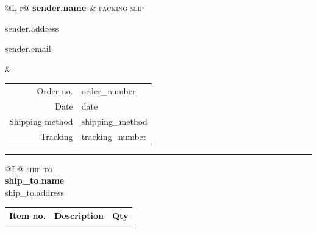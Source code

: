 \documentclass[10pt,a4paper]{article}
\newcommand{\fieldname}[1]{\textcolor{muted}{\footnotesize\scshape\MakeLowercase{#1}}}
\begin{document}
\color{ink}
{%
\begin{tabularx}{\linewidth}{@{}L r@{}}
  {\Large\bfseries\mbox{}{{ sender.name }}} & \textcolor{accent}{\fontsize{22}{24}\selectfont\scshape packing slip} \\[6pt]
  \parbox[t]{0.5\linewidth}{\raggedright\small\mbox{}{{ sender.address }}\par\mbox{}{{ sender.email }}} &
  {\small\begin{tabular}[t]{@{}r@{\hspace{8pt}}l@{}}
    \textcolor{muted}{Order no.} & {{ order_number }} \\
    \textcolor{muted}{Date} & {{ date }} \\
    \textcolor{muted}{Shipping method} & {{ shipping_method }} \\
    \textcolor{muted}{Tracking} & {{ tracking_number }} \\
  \end{tabular}}
\end{tabularx}

\vspace{10pt}
\textcolor{accent}{\rule{\linewidth}{0.8pt}}
\vspace{8pt}

\begin{tabularx}{\linewidth}{@{}L@{}}
  \fieldname{Ship to} \\[2pt]
  {\bfseries\mbox{}{{ ship_to.name }}} \\
  {\small {{ ship_to.address }}}
\end{tabularx}

\vspace{18pt}
{\renewcommand{\arraystretch}{1.45}\setlength{\LTpre}{0pt}\setlength{\LTpost}{0pt}\setlength{\LTleft}{0pt}\setlength{\LTright}{0pt}
\begin{longtable}{@{}>{\raggedright\arraybackslash}p{30mm} >{\raggedright\arraybackslash}p{\dimexpr\linewidth-6\tabcolsep-30mm-18mm\relax} >{\raggedleft\arraybackslash}p{18mm}@{}}
  \toprule
  \textbf{Item no.} & \textbf{Description} & \textbf{Qty} \\
  \midrule
\endhead
  \bottomrule
\endfoot
  \bottomrule
\endlastfoot
{%
{%

}}
\end{longtable}}}
\end{document}
